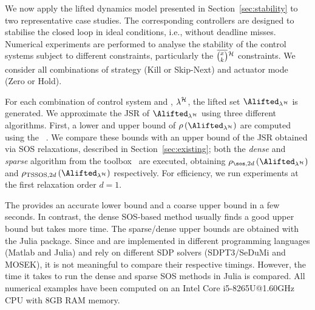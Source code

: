 We now apply the lifted dynamics model presented in Section~\ref{sec:stability} to two representative case studies.
The corresponding controllers are designed to stabilise the closed loop in ideal conditions, i.e., without deadline misses.
Numerical experiments are performed to analyse the stability of the control systems subject to different constraints, particularly the $\eanymiss{}{\strat}$ constraints.
We consider all combinations of strategy (Kill or Skip-Next) and actuator mode (Zero or Hold).

For each combination of control system and \ewhc{}, $\lambda^{\mathcal{H}}$, the lifted set $\Alifted_{\lambda^\strat}$ is generated.
We approximate the JSR of $\Alifted_{\lambda^\strat}$ using three different algorithms.
First, a lower and upper bound of $\rho \left( \Alifted_{\lambda^\strat} \right)$ are computed using the ~\cite{vankeerberghen2014jsr}.
We compare these bounds with an upper bound of the JSR obtained via SOS relaxations, described in Section~\ref{sec:existing}; both the \emph{dense} and \emph{sparse} algorithm from the  toolbox~\cite{sparsejsr} are executed, obtaining $\rho_{\sos,2d}\left(\Alifted_{\lambda^\strat}\right)$ and $\rho_{\textrm{TSSOS},2d}\left(\Alifted_{\lambda^\strat}\right)$ respectively.
%
For efficiency, we run experiments at the first relaxation order $d = 1$.

The  provides an accurate lower bound and a coarse upper bound in a few seconds.
In contrast, the dense SOS-based method usually finds a good upper bound but takes more time.
The sparse/dense upper bounds are obtained with the  Julia package.
Since  and  are implemented in different programming languages (Matlab and Julia) and rely on different SDP solvers (SDPT3/SeDuMi and MOSEK), it is not meaningful to compare their respective timings.
However, the time it takes to run the dense and sparse SOS methods in Julia is compared.
All numerical examples have been computed on an Intel Core i5-8265U@1.60GHz CPU with 8GB RAM memory.


